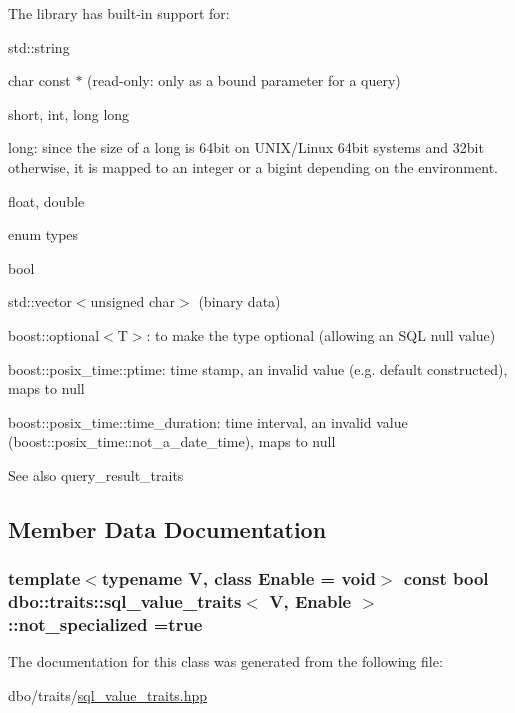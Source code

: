 The library has built-\/in support for\+:
\begin{DoxyItemize}
\item {\ttfamily std\+::string}
\item {\ttfamily char const $\ast$} (read-\/only\+: only as a bound parameter for a query)
\item {\ttfamily short}, {\ttfamily int}, {\ttfamily long long}
\item {\ttfamily long}\+: since the size of a {\ttfamily long} is 64bit on U\+N\+I\+X/\+Linux 64bit systems and 32bit otherwise, it is mapped to an {\ttfamily integer} or a {\ttfamily bigint} depending on the environment.
\item {\ttfamily float}, {\ttfamily double}
\item enum types
\item {\ttfamily bool}
\item {\ttfamily std\+::vector$<$unsigned char$>$} (binary data)
\item {\ttfamily boost\+::optional$<$\+T$>$}\+: to make the type optional (allowing an S\+Q\+L {\ttfamily null} value)
\item {\ttfamily boost\+::posix\+\_\+time\+::ptime}\+: time stamp, an invalid value (e.\+g. default constructed), maps to {\ttfamily null}
\item {\ttfamily boost\+::posix\+\_\+time\+::time\+\_\+duration}\+: time interval, an invalid value (boost\+::posix\+\_\+time\+::not\+\_\+a\+\_\+date\+\_\+time), maps to {\ttfamily null}
\end{DoxyItemize}

\begin{DoxySeeAlso}{See also}
query\+\_\+result\+\_\+traits 
\end{DoxySeeAlso}


\subsection{Member Data Documentation}
\hypertarget{structdbo_1_1traits_1_1sql__value__traits_ac05f51eeec8be981aa7be0aac21858be}{
\subsubsection[{not\+\_\+specialized}]{\setlength{\rightskip}{0pt plus 5cm}template$<$typename V, class Enable  = void$>$ const bool {\bf dbo\+::traits\+::sql\+\_\+value\+\_\+traits}$<$ V, Enable $>$\+::not\+\_\+specialized =true\hspace{0.3cm}{\ttfamily [static]}}}\label{structdbo_1_1traits_1_1sql__value__traits_ac05f51eeec8be981aa7be0aac21858be}


The documentation for this class was generated from the following file\+:\begin{DoxyCompactItemize}
\item 
dbo/traits/\hyperlink{sql__value__traits_8hpp}{sql\+\_\+value\+\_\+traits.\+hpp}\end{DoxyCompactItemize}

